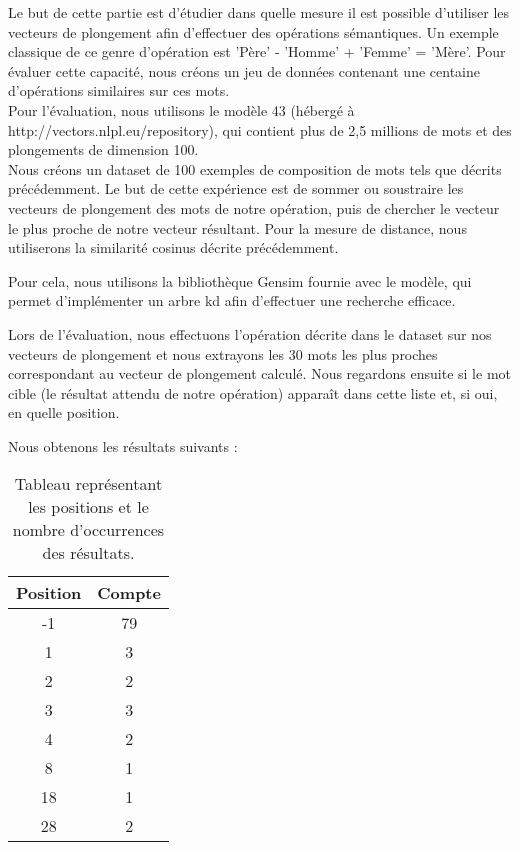 \documentclass[12pt]{article}
\begin{document}
Le but de cette partie est d'étudier dans quelle mesure il est possible d'utiliser les vecteurs
de plongement afin d'effectuer des opérations sémantiques. Un exemple classique de ce genre d'opération est
'Père' - 'Homme' + 'Femme' = 'Mère'. Pour évaluer cette capacité, nous créons un jeu de données contenant une 
centaine d'opérations similaires sur ces mots. \\
Pour l'évaluation, nous utilisons le modèle 43 (hébergé à http://vectors.nlpl.eu/repository), qui contient 
plus de 2,5 millions de mots et des plongements de dimension 100. \\
Nous créons un dataset de 100 exemples de composition de mots tels que décrits précédemment. 
Le but de cette expérience est de sommer ou soustraire les vecteurs de plongement des mots de notre opération,
puis de chercher le vecteur le plus proche de notre vecteur résultant. 
Pour la mesure de distance, nous utiliserons la similarité cosinus décrite précédemment.

Pour cela, nous utilisons la bibliothèque Gensim fournie avec le modèle, qui permet d'implémenter un arbre kd
afin d'effectuer une recherche efficace. 

Lors de l'évaluation, nous effectuons l'opération décrite dans le dataset sur nos vecteurs de plongement et nous extrayons 
les 30 mots les plus proches correspondant au vecteur de plongement calculé. Nous regardons ensuite si le mot cible (le 
résultat attendu de notre opération) apparaît dans cette liste et, si oui, en quelle position. 

Nous obtenons les résultats suivants : 

\begin{table}[h!]
    \centering
    \begin{tabular}{|c|c|}
    \hline
    \textbf{Position} & \textbf{Compte} \\ \hline
    -1           & 79              \\ \hline
    1            & 3               \\ \hline
    2            & 2               \\ \hline
    3            & 3               \\ \hline
    4            & 2               \\ \hline
    8            & 1               \\ \hline
    18           & 1               \\ \hline
    28           & 2               \\ \hline
    \end{tabular}
    \caption{Tableau représentant les positions et le nombre d'occurrences des résultats.}
    \label{tab:dictionnaire}
\end{table}
\end{document}
